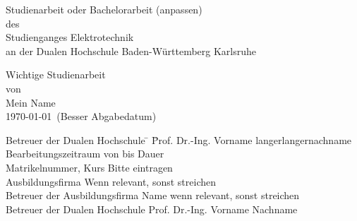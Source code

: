 \begin{titlepage}
  \begin{center}\large
    \vspace*{1cm}
    Studienarbeit oder Bachelorarbeit (anpassen)\\
    des \\
    Studienganges Elektrotechnik
    \\
    an der Dualen Hochschule Baden-Württemberg Karlsruhe
    \vspace*{2cm}

    {\huge Wichtige Studienarbeit}\\
    \vspace*{2cm}
    von\\
    \vspace*{.5cm}
    Mein Name\\
    \vspace*{.5cm}
    \today\ (Besser Abgabedatum)\\
    \vspace*{2cm}
    \vspace*{2cm}
  \end{center}
  \vspace*{2cm}

  \begin{tabbing}
    Betreuer der Dualen Hochschule \= \hspace{5mm} \= Prof. Dr.-Ing. Vorname langerlangernachname \kill
    Bearbeitungszeitraum \> \> von bis Dauer\\
    Matrikelnummer, Kurs \> \> Bitte eintragen \\
    Ausbildungsfirma \> \> Wenn relevant, sonst streichen \\
    Betreuer der Ausbildungsfirma \> \> Name wenn relevant, sonst
    streichen \\
    Betreuer der Dualen Hochschule \> \> Prof. Dr.-Ing. Vorname Nachname    
  \end{tabbing}
\end{titlepage}
\vspace*{\fill}




